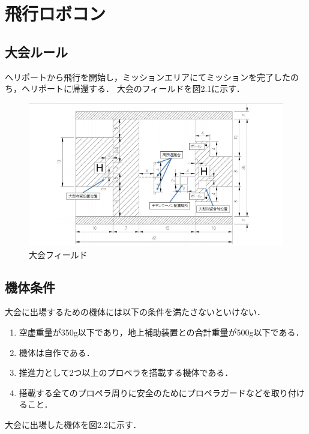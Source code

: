 \chapter{飛行ロボコン}

\section{大会ルール}
ヘリポートから飛行を開始し，ミッションエリアにてミッションを完了したのち，ヘリポートに帰還する．
大会のフィールドを図2.1に示す．

\begin{figure}[htbp]
  \begin{center}
    \includegraphics[width=120mm]{img/フィールド.jpg}
    \end{center}
  \caption{大会フィールド}
 \label{fig:robot}
\end{figure}

\section{機体条件}
大会に出場するための機体には以下の条件を満たさないといけない．
\begin{enumerate}
  \item 空虚重量が350g以下であり，地上補助装置との合計重量が500g以下である．
  \item 機体は自作である．
  \item 推進力として2つ以上のプロペラを搭載する機体である．
  \item 搭載する全てのプロペラ周りに安全のためにプロペラガードなどを取り付けること．

\end{enumerate}

大会に出場した機体を図2.2に示す．


